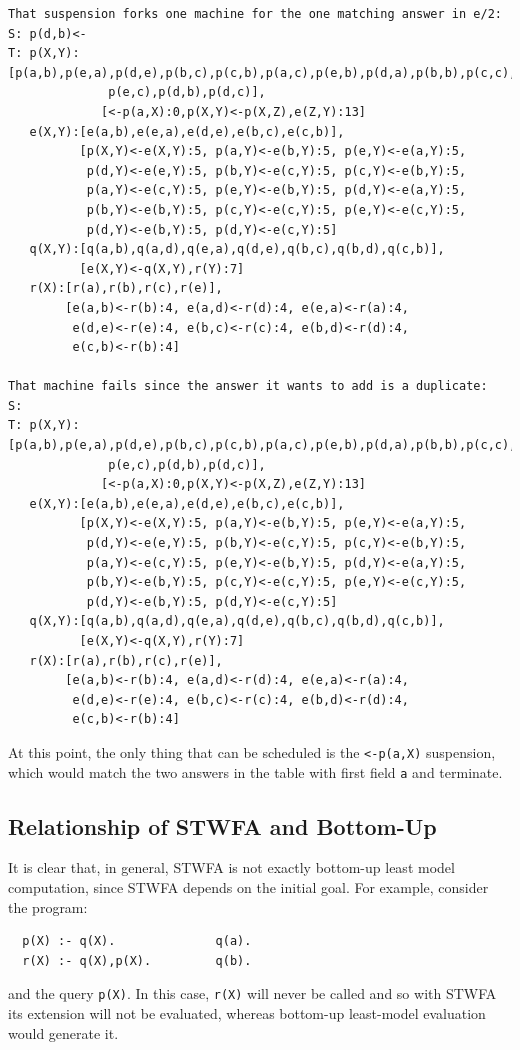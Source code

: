 \begin{verbatim}
That suspension forks one machine for the one matching answer in e/2:
S: p(d,b)<-
T: p(X,Y):[p(a,b),p(e,a),p(d,e),p(b,c),p(c,b),p(a,c),p(e,b),p(d,a),p(b,b),p(c,c),
              p(e,c),p(d,b),p(d,c)],
             [<-p(a,X):0,p(X,Y)<-p(X,Z),e(Z,Y):13]
   e(X,Y):[e(a,b),e(e,a),e(d,e),e(b,c),e(c,b)],
          [p(X,Y)<-e(X,Y):5, p(a,Y)<-e(b,Y):5, p(e,Y)<-e(a,Y):5,
           p(d,Y)<-e(e,Y):5, p(b,Y)<-e(c,Y):5, p(c,Y)<-e(b,Y):5,
           p(a,Y)<-e(c,Y):5, p(e,Y)<-e(b,Y):5, p(d,Y)<-e(a,Y):5,
           p(b,Y)<-e(b,Y):5, p(c,Y)<-e(c,Y):5, p(e,Y)<-e(c,Y):5,
           p(d,Y)<-e(b,Y):5, p(d,Y)<-e(c,Y):5]
   q(X,Y):[q(a,b),q(a,d),q(e,a),q(d,e),q(b,c),q(b,d),q(c,b)],
          [e(X,Y)<-q(X,Y),r(Y):7]
   r(X):[r(a),r(b),r(c),r(e)],
        [e(a,b)<-r(b):4, e(a,d)<-r(d):4, e(e,a)<-r(a):4,
         e(d,e)<-r(e):4, e(b,c)<-r(c):4, e(b,d)<-r(d):4,
         e(c,b)<-r(b):4]

That machine fails since the answer it wants to add is a duplicate:
S: 
T: p(X,Y):[p(a,b),p(e,a),p(d,e),p(b,c),p(c,b),p(a,c),p(e,b),p(d,a),p(b,b),p(c,c),
              p(e,c),p(d,b),p(d,c)],
             [<-p(a,X):0,p(X,Y)<-p(X,Z),e(Z,Y):13]
   e(X,Y):[e(a,b),e(e,a),e(d,e),e(b,c),e(c,b)],
          [p(X,Y)<-e(X,Y):5, p(a,Y)<-e(b,Y):5, p(e,Y)<-e(a,Y):5,
           p(d,Y)<-e(e,Y):5, p(b,Y)<-e(c,Y):5, p(c,Y)<-e(b,Y):5,
           p(a,Y)<-e(c,Y):5, p(e,Y)<-e(b,Y):5, p(d,Y)<-e(a,Y):5,
           p(b,Y)<-e(b,Y):5, p(c,Y)<-e(c,Y):5, p(e,Y)<-e(c,Y):5,
           p(d,Y)<-e(b,Y):5, p(d,Y)<-e(c,Y):5]
   q(X,Y):[q(a,b),q(a,d),q(e,a),q(d,e),q(b,c),q(b,d),q(c,b)],
          [e(X,Y)<-q(X,Y),r(Y):7]
   r(X):[r(a),r(b),r(c),r(e)],
        [e(a,b)<-r(b):4, e(a,d)<-r(d):4, e(e,a)<-r(a):4,
         e(d,e)<-r(e):4, e(b,c)<-r(c):4, e(b,d)<-r(d):4,
         e(c,b)<-r(b):4]
\end{verbatim}
\normalsize

At this point, the only thing that can be scheduled is the
\verb|<-p(a,X)| suspension, which would match the two answers in
the table with first field {\tt a} and terminate.

\subsection{Relationship of STWFA and Bottom-Up}

It is clear that, in general, STWFA is not exactly bottom-up least
model computation, since STWFA depends on the initial goal.  For
example, consider the program:
\footnotesize
\begin{verbatim}
  p(X) :- q(X).              q(a).
  r(X) :- q(X),p(X).         q(b).
\end{verbatim}
\normalsize
and the query \verb|p(X)|. In this case, \verb|r(X)| will never be
called and so with STWFA its extension will not be evaluated, whereas
bottom-up least-model evaluation would generate it.

